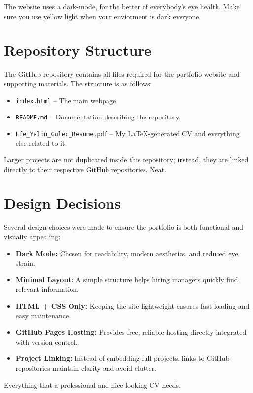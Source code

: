 \documentclass[12pt]{article}
\begin{document}
The website uses a dark-mode, for the better of everybody's eye health. Make sure you use yellow light when your enviorment is dark everyone.

\section{Repository Structure}

The GitHub repository contains all files required for the portfolio website and supporting materials. The structure is as follows:

\begin{itemize}
    \item \texttt{index.html} – The main webpage.
    \item \texttt{README.md} – Documentation describing the repository.
    \item \texttt{Efe\_Yalin\_Gulec\_Resume.pdf} – My LaTeX-generated CV and everything else related to it.
\end{itemize}

Larger projects are not duplicated inside this repository; instead, they are linked directly to their respective GitHub repositories. Neat.

\section{Design Decisions}

Several design choices were made to ensure the portfolio is both functional and visually appealing:

\begin{itemize}
    \item \textbf{Dark Mode:} Chosen for readability, modern aesthetics, and reduced eye strain.
    \item \textbf{Minimal Layout:} A simple structure helps hiring managers quickly find relevant information.
    \item \textbf{HTML + CSS Only:} Keeping the site lightweight ensures fast loading and easy maintenance.
    \item \textbf{GitHub Pages Hosting:} Provides free, reliable hosting directly integrated with version control.
    \item \textbf{Project Linking:} Instead of embedding full projects, links to GitHub repositories maintain clarity and avoid clutter.
\end{itemize}

Everything that a professional and nice looking CV needs.
\end{document}
